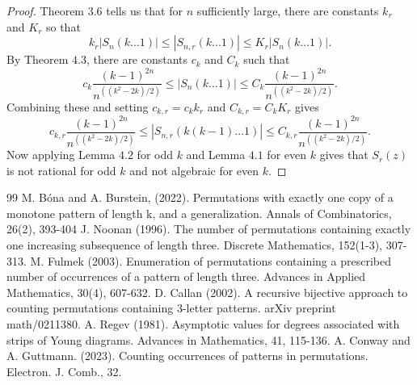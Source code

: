 \documentclass[11pt]{amsart}
\theoremstyle{remark}
\numberwithin{equation}{section}
\begin{document}
\begin{proof}
    Theorem $3.6$ tells us that for $n$ sufficiently large, there are constants $k_r$ and $K_r$ so that
    \[
    k_r|S_n(k...1)| \leq |S_{n,r}(k...1)| \leq K_r|S_n(k...1)|.
    \]
    By Theorem $4.3$, there are constants $c_k$ and $C_k$ such that 
    \[
    c_k \frac{(k-1)^{2n}}{n^{((k^2-2k)/2)}} \leq |S_n(k...1)| \leq C_k \frac{(k-1)^{2n}}{n^{((k^2-2k)/2)}}.
    \]
    Combining these and setting $c_{k,r} = c_k k_r$ and $C_{k,r} = C_k K_r$ gives
    \[
    c_{k,r} \frac{(k-1)^{2n}}{n^{((k^2-2k)/2)}} \leq |S_{n,r}(k(k-1)...1)| \leq C_{k,r} \frac{(k-1)^{2n}}{n^{((k^2-2k)/2)}}.
    \]
    Now applying Lemma $4.2$ for odd $k$ and Lemma $4.1$ for even $k$ gives that $S_r(z)$ is not rational for odd $k$ and not algebraic for even $k$.
    
\end{proof}

\begin{thebibliography}{99}
  M. Bóna and A. Burstein,  (2022). Permutations with exactly one copy of a monotone pattern of length k, and a generalization. Annals of Combinatorics, 26(2), 393-404
 J. Noonan (1996). The number of permutations containing exactly one increasing subsequence of length three. Discrete Mathematics, 152(1-3), 307-313.
 M. Fulmek (2003). Enumeration of permutations containing a prescribed number of occurrences of a pattern of length three. Advances in Applied Mathematics, 30(4), 607-632.
 D. Callan (2002). A recursive bijective approach to counting permutations containing 3-letter patterns. arXiv preprint math/0211380.
 A. Regev (1981). Asymptotic values for degrees associated with strips of Young diagrams. Advances in Mathematics, 41, 115-136.
 A. Conway and A. Guttmann. (2023). Counting occurrences of patterns in permutations. Electron. J. Comb., 32.

\end{thebibliography}
\end{document}
